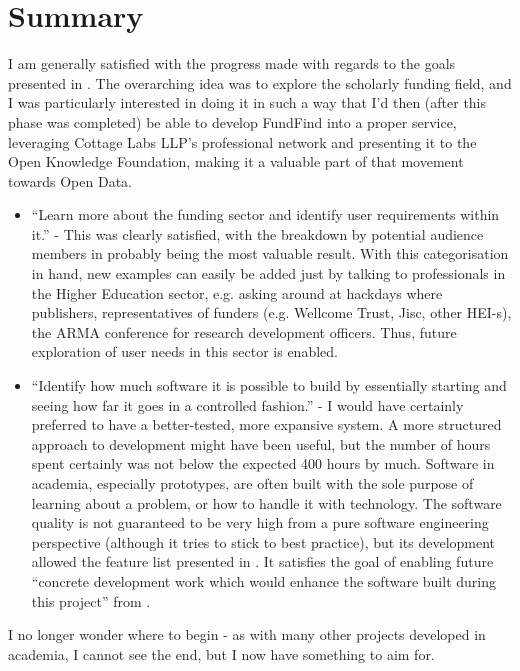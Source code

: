 \section{Summary}

I am generally satisfied with the progress made with regards to the goals presented in . The overarching idea was to explore the scholarly funding field, and I was particularly interested in doing it in such a way that I'd then (after this phase was completed) be able to develop FundFind into a proper service, leveraging Cottage Labs LLP's professional network and presenting it to the Open Knowledge Foundation, making it a valuable part of that movement towards Open Data.

\begin{itemize}
 \item ``Learn more about the funding sector and identify user requirements within it.'' - This was clearly satisfied, with the breakdown by potential audience members in  probably being the most valuable result. With this categorisation in hand, new examples can easily be added just by talking to professionals in the Higher Education sector, e.g. asking around at hackdays where publishers, representatives of funders (e.g. Wellcome Trust, Jisc, other HEI-s), the ARMA conference for research development officers. Thus, future exploration of user needs in this sector is enabled.
  
 \item ``Identify how much software it is possible to build by essentially starting and seeing how far it goes in a controlled fashion.'' - I would have certainly preferred to have a better-tested, more expansive system. A more structured approach to development might have been useful, but the number of hours spent certainly was not below the expected 400 hours by much. Software in academia, especially prototypes, are often built with the sole purpose of learning about a problem, or how to handle it with technology. The software quality is not guaranteed to be very high from a pure software engineering perspective (although it tries to stick to best practice), but its development allowed the feature list presented in . It satisfies the goal of enabling future ``concrete development work which would enhance the software built during this project'' from .
\end{itemize}

I no longer wonder where to begin - as with many other projects developed in academia, I cannot see the end, but I now have something to aim for.